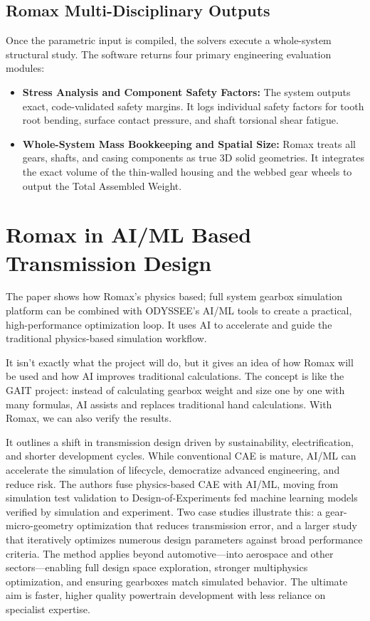     \subsection{Romax Multi-Disciplinary Outputs}
        Once the parametric input is compiled, the solvers execute a whole-system structural study. 
        The software returns four primary engineering evaluation modules:
            \begin{itemize}
                \item \textbf{Stress Analysis and Component Safety Factors:} The system outputs exact, code-validated safety margins. It logs individual safety factors for tooth root bending, surface contact pressure, and shaft torsional shear fatigue.
                \item \textbf{Whole-System Mass Bookkeeping and Spatial Size:} Romax treats all gears, shafts, and casing components as true 3D solid geometries. It integrates the exact volume of the thin-walled housing and the webbed gear wheels to output the Total Assembled Weight.
            \end{itemize}

\section{Romax in AI/ML Based Transmission Design}
    The paper shows how Romax's physics based; full system gearbox simulation platform can be combined 
    with ODYSSEE's AI/ML tools to create a practical, high-performance optimization loop. It uses AI 
    to accelerate and guide the traditional physics-based simulation workflow.

    It isn't exactly what the project will do, but it gives an idea of how Romax will be used and how 
    AI improves traditional calculations. The concept is like the GAIT project: instead of calculating 
    gearbox weight and size one by one with many formulas, AI assists and replaces traditional hand 
    calculations. With Romax, we can also verify the results.

    It outlines a shift in transmission design driven by sustainability, electrification, and shorter 
    development cycles. While conventional CAE is mature, AI/ML can accelerate the simulation of 
    lifecycle, democratize advanced engineering, and reduce risk. The authors fuse physics-based 
    CAE with AI/ML, moving from simulation test validation to Design-of-Experiments fed machine 
    learning models verified by simulation and experiment. Two case studies illustrate this: 
    a gear-micro-geometry optimization that reduces transmission error, and a larger study that 
    iteratively optimizes numerous design parameters against broad performance criteria. The method 
    applies beyond automotive—into aerospace and other sectors—enabling full design space exploration, 
    stronger multiphysics optimization, and ensuring gearboxes match simulated behavior. The ultimate 
    aim is faster, higher quality powertrain development with less reliance on specialist expertise.

